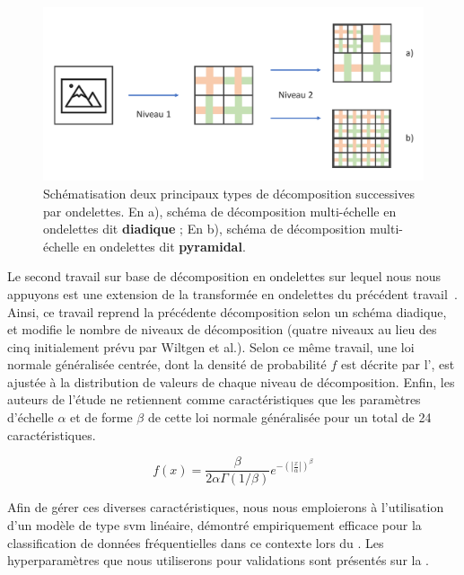\begin{figure}[H]
    \centering
    \includegraphics[width=\textwidth]{contents/chapter_5/resources/scheme_image_improvement_dwt_decomposition.pdf}
    \caption{Schématisation deux principaux types de décomposition successives par ondelettes. En a), schéma de décomposition multi-échelle en ondelettes dit \textbf{diadique} ; En b), schéma de décomposition multi-échelle en ondelettes dit \textbf{pyramidal}.}
    \label{fig:scheme_image_improvement_dwt_decomposition}
\end{figure}\par

Le second travail sur base de décomposition en ondelettes sur lequel nous nous appuyons est une extension de la transformée en ondelettes du précédent travail~\cite{Halimi2017a}. Ainsi, ce travail reprend la précédente décomposition selon un schéma diadique, et modifie le nombre de niveaux de décomposition (quatre niveaux au lieu des cinq initialement prévu par Wiltgen et al.). Selon ce même travail, une loi normale généralisée centrée, dont la densité de probabilité $f$ est décrite par l', est ajustée à la distribution de valeurs de chaque niveau de décomposition. Enfin, les auteurs de l'étude ne retiennent comme caractéristiques que les paramètres d'échelle $\alpha$ et de forme $\beta$ de cette loi normale généralisée pour un total de 24 caractéristiques.\par

\begin{equation}
    f(x)= \frac{\beta}{2\alpha\Gamma(1/\beta)} e^{-\left(|\frac{x}{\alpha}|\right)^\beta}
    \label{eq:image_improvement_ggd}
\end{equation}

Afin de gérer ces diverses caractéristiques, nous nous emploierons à l'utilisation d'un modèle de type \gls{svm} linéaire, démontré empiriquement efficace pour la classification de données fréquentielles dans ce contexte lors du . Les hyperparamètres que nous utiliserons pour validations sont présentés sur la .\par

